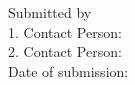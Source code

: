 \thispagestyle{empty}
\sffamily
$ $\\
\thesisTitel \text{ } \\

\vspace{1cm}

Submitted \thesistype \text{ }by \authors  \\

1. Contact Person: \professor \\
2. Contact Person: \betreuer \\

Date of submission: 
\normalfont